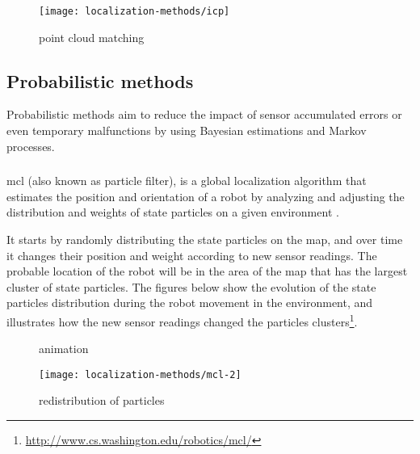 \begin{figure}[H]
	\centering
	\texttt{[image: localization-methods/icp]}
	\caption[ point cloud matching]{ point cloud matching\protect\footnotemark}
	\label{fig:localization-methods_icp}
\end{figure}


\subsection{Probabilistic methods}

Probabilistic methods aim to reduce the impact of sensor accumulated errors or even temporary malfunctions by using Bayesian estimations and Markov processes.


\subsubsection{}

\gls{mcl} (also known as particle filter), is a global localization algorithm that estimates the position and orientation of a robot by analyzing and adjusting the distribution and weights of state particles on a given environment \cite{Bshara2010,Arulampalam2002,Blanco2010,Chen2003b,Fox1999,Saito2009}.

It starts by randomly distributing the state particles on the map, and over time it changes their position and weight according to new sensor readings. The probable location of the robot will be in the area of the map that has the largest cluster of state particles. The figures below show the evolution of the state particles distribution during the robot movement in the environment, and illustrates how the new sensor readings changed the particles clusters\footnote{\url{http://www.cs.washington.edu/robotics/mcl/}}.

\begin{figure}[H]
	\centering
	\begin{minipage}[h]{.49\textwidth}
		\centering
		\caption{ animation}
		\label{fig:localization-methods_mcl1}
	\end{minipage}\hfill
	\begin{minipage}[h]{.49\textwidth}
		\centering
		\texttt{[image: localization-methods/mcl-2]}
		\caption{ redistribution of particles}
		\label{fig:localization-methods_mcl2}
	\end{minipage}
\end{figure}

